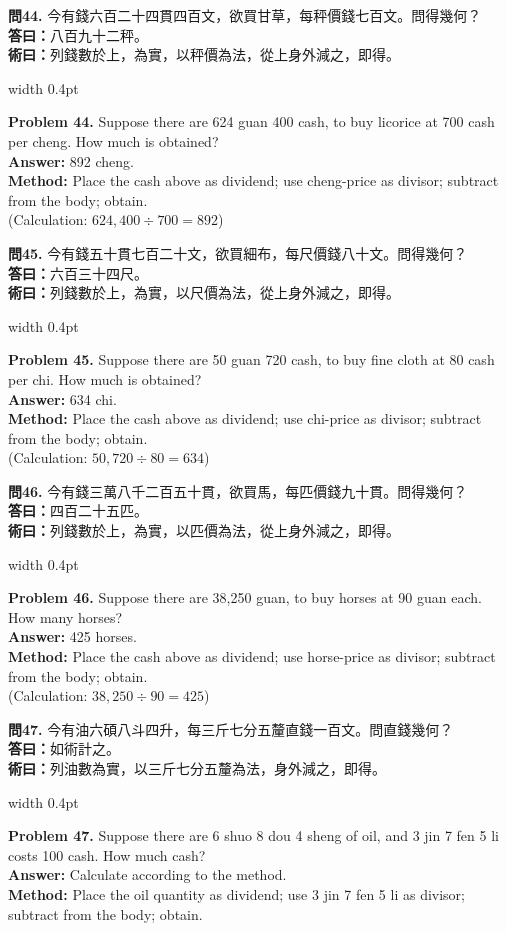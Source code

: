 \documentclass[10pt,a4paper]{article}
\newlength{\cnwidth}
\newlength{\enwidth}
\newcommand{\bilingual}[2]{%
  \noindent%
  \begin{minipage}[t]{\cnwidth}%
    #1%
  \end{minipage}%
  \hfill\vrule width 0.4pt\hfill%
  \begin{minipage}[t]{\enwidth}%
    #2%
  \end{minipage}%
  \par\smallskip%
}
\begin{document}
\bilingual{%
  \textbf{問44.}
  今有錢六百二十四貫四百文，欲買甘草，每秤價錢七百文。問得幾何？\\
  \textbf{答曰：}八百九十二秤。\\
  \textbf{術曰：}列錢數於上，為實，以秤價為法，從上身外減之，即得。
}{%
  \textbf{Problem 44.}
  Suppose there are 624 guan 400 cash, to buy licorice at 700 cash per cheng.
  How much is obtained?\\
  \textbf{Answer:} 892 cheng.\\
  \textbf{Method:} Place the cash above as dividend; use cheng-price as divisor;
  subtract from the body; obtain.\\
  (Calculation: $624{,}400 \div 700 = 892$)
}

\bilingual{%
  \textbf{問45.}
  今有錢五十貫七百二十文，欲買細布，每尺價錢八十文。問得幾何？\\
  \textbf{答曰：}六百三十四尺。\\
  \textbf{術曰：}列錢數於上，為實，以尺價為法，從上身外減之，即得。
}{%
  \textbf{Problem 45.}
  Suppose there are 50 guan 720 cash, to buy fine cloth at 80 cash per chi.
  How much is obtained?\\
  \textbf{Answer:} 634 chi.\\
  \textbf{Method:} Place the cash above as dividend; use chi-price as divisor;
  subtract from the body; obtain.\\
  (Calculation: $50{,}720 \div 80 = 634$)
}

\bilingual{%
  \textbf{問46.}
  今有錢三萬八千二百五十貫，欲買馬，每匹價錢九十貫。問得幾何？\\
  \textbf{答曰：}四百二十五匹。\\
  \textbf{術曰：}列錢數於上，為實，以匹價為法，從上身外減之，即得。
}{%
  \textbf{Problem 46.}
  Suppose there are 38,250 guan, to buy horses at 90 guan each.
  How many horses?\\
  \textbf{Answer:} 425 horses.\\
  \textbf{Method:} Place the cash above as dividend; use horse-price as divisor;
  subtract from the body; obtain.\\
  (Calculation: $38{,}250 \div 90 = 425$)
}

\bilingual{%
  \textbf{問47.}
  今有油六碩八斗四升，每三斤七分五釐直錢一百文。問直錢幾何？\\
  \textbf{答曰：}如術計之。\\
  \textbf{術曰：}列油數為實，以三斤七分五釐為法，身外減之，即得。
}{%
  \textbf{Problem 47.}
  Suppose there are 6 shuo 8 dou 4 sheng of oil, and 3 jin 7 fen 5 li costs
  100 cash. How much cash?\\
  \textbf{Answer:} Calculate according to the method.\\
  \textbf{Method:} Place the oil quantity as dividend; use 3 jin 7 fen 5 li as
  divisor; subtract from the body; obtain.
}
\end{document}
